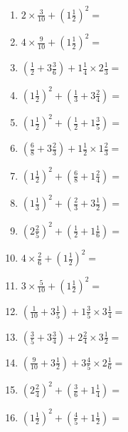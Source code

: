 \documentclass[12pt]{article}
\begin{document}
\begin{enumerate}
\newpage
\item \large $ 2 \times \frac{3}{10} + (1 \frac{1}{2})^2 = $ \vspace{1.8cm}
\item \large $ 4 \times \frac{9}{10} + (1 \frac{1}{2})^2 = $ \vspace{1.8cm}
\item \large $ (\frac{1}{2} + 3 \frac{3}{6}) + 1 \frac{1}{4} \times 2 \frac{1}{3} = $ \vspace{1.8cm}
\item \large $ (1 \frac{1}{2})^2 + (\frac{1}{3} + 3 \frac{2}{4}) = $ \vspace{1.8cm}
\item \large $ (1 \frac{1}{2})^2 + (\frac{1}{2} + 1 \frac{3}{5}) = $ \vspace{1.8cm}
\item \large $ (\frac{6}{8} + 3 \frac{2}{3}) + 1 \frac{1}{2} \times 1 \frac{2}{3} = $ \vspace{1.8cm}
\item \large $ (1 \frac{1}{2})^2 + (\frac{6}{8} + 1 \frac{2}{4}) = $ \vspace{1.8cm}
\item \large $ (1 \frac{1}{3})^2 + (\frac{2}{3} + 3 \frac{1}{2}) = $ \vspace{1.8cm}
\item \large $ (2 \frac{2}{5})^2 + (\frac{1}{2} + 1 \frac{1}{6}) = $ \vspace{1.8cm}
\item \large $ 4 \times \frac{2}{6} + (1 \frac{1}{2})^2 = $ \vspace{1.8cm}
\newpage
\item \large $ 3 \times \frac{5}{10} + (1 \frac{1}{2})^2 = $ \vspace{1.8cm}
\item \large $ (\frac{1}{10} + 3 \frac{1}{5}) + 1 \frac{3}{5} \times 3 \frac{1}{4} = $ \vspace{1.8cm}
\item \large $ (\frac{3}{5} + 3 \frac{3}{4}) + 2 \frac{2}{4} \times 3 \frac{1}{2} = $ \vspace{1.8cm}
\item \large $ (\frac{9}{10} + 3 \frac{1}{2}) + 3 \frac{4}{5} \times 2 \frac{1}{6} = $ \vspace{1.8cm}
\item \large $ (2 \frac{2}{4})^2 + (\frac{3}{6} + 1 \frac{1}{4}) = $ \vspace{1.8cm}
\item \large $ (1 \frac{1}{2})^2 + (\frac{4}{5} + 1 \frac{1}{2}) = $ \vspace{1.8cm}

\end{enumerate}
\end{document}
